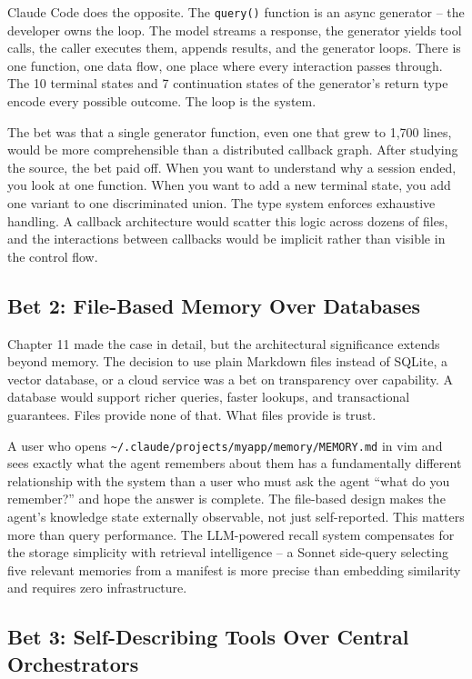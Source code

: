 \documentclass[
  english,
  11pt,
  letterpaper,
]{book}
\begin{document}
Claude Code does the opposite. The \texttt{query()} function is an async
generator -- the developer owns the loop. The model streams a response,
the generator yields tool calls, the caller executes them, appends
results, and the generator loops. There is one function, one data flow,
one place where every interaction passes through. The 10 terminal states
and 7 continuation states of the generator's return type encode every
possible outcome. The loop is the system.

The bet was that a single generator function, even one that grew to
1,700 lines, would be more comprehensible than a distributed callback
graph. After studying the source, the bet paid off. When you want to
understand why a session ended, you look at one function. When you want
to add a new terminal state, you add one variant to one discriminated
union. The type system enforces exhaustive handling. A callback
architecture would scatter this logic across dozens of files, and the
interactions between callbacks would be implicit rather than visible in
the control flow.

\subsection{Bet 2: File-Based Memory Over
Databases}\label{bet-2-file-based-memory-over-databases}

Chapter 11 made the case in detail, but the architectural significance
extends beyond memory. The decision to use plain Markdown files instead
of SQLite, a vector database, or a cloud service was a bet on
transparency over capability. A database would support richer queries,
faster lookups, and transactional guarantees. Files provide none of
that. What files provide is trust.

A user who opens
\texttt{\textasciitilde{}/.claude/projects/myapp/memory/MEMORY.md} in
vim and sees exactly what the agent remembers about them has a
fundamentally different relationship with the system than a user who
must ask the agent ``what do you remember?'' and hope the answer is
complete. The file-based design makes the agent's knowledge state
externally observable, not just self-reported. This matters more than
query performance. The LLM-powered recall system compensates for the
storage simplicity with retrieval intelligence -- a Sonnet side-query
selecting five relevant memories from a manifest is more precise than
embedding similarity and requires zero infrastructure.

\subsection{Bet 3: Self-Describing Tools Over Central
Orchestrators}\label{bet-3-self-describing-tools-over-central-orchestrators}
\end{document}
